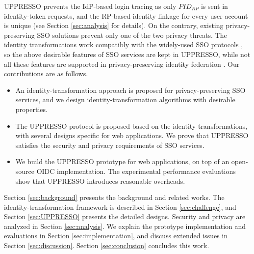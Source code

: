 UPPRESSO prevents the IdP-based login tracing as only $PID_{RP}$ is sent in identity-token requests,
    and the RP-based identity linkage for every user account is unique
    (see Section \ref{sec:analysis} for details).
On the contrary,
     existing privacy-preserving SSO solutions \cite{BrowserID,SPRESSO,NIST2017draft,FirefoxAccount} prevent only one of the two privacy threats.
The identity transformations work compatibly with
    the widely-used SSO protocols \cite{OpenIDConnect,rfc6749,SAML,NIST2017draft},
    so the above desirable features of SSO services are kept in UPPRESSO,
    while not all these features are supported in privacy-preserving identity federation \cite{PseudoID,ELPASSO,UnlimitID,Opaak,uprov,hyperledge-idemix}.
%
%
Our contributions are as follows.
\vspace{-\topsep}\begin{itemize}
\setlength{\topsep}{0pt}
\setlength{\partopsep}{0pt}
\setlength{\itemsep}{0pt}
\setlength{\parsep}{0pt}
\setlength{\parskip}{0pt}
\item An identity-transformation approach is proposed for privacy-preserving SSO services,
        and we design identity-transformation algorithms with desirable properties.
\item
The UPPRESSO protocol is proposed based on the identity transformations,
    with several designs specific for web applications.
We prove that UPPRESSO satisfies the security and privacy requirements of SSO services.

\item
We build the UPPRESSO prototype for web applications,
    on top of an open-source OIDC implementation.
The experimental performance evaluations show that UPPRESSO introduces reasonable overheads.
\end{itemize}


Section \ref{sec:background} presents
    the background and related works.
The identity-transformation framework is described in Section \ref{sec:challenge},
    and Section \ref{sec:UPPRESSO} presents the detailed designs.
Security and privacy are analyzed in Section \ref{sec:analysis}.
We explain the prototype implementation and evaluations in Section \ref{sec:implementation},
 and discuss extended issues in Section \ref{sec:discussion}.
Section \ref{sec:conclusion} concludes this work.
